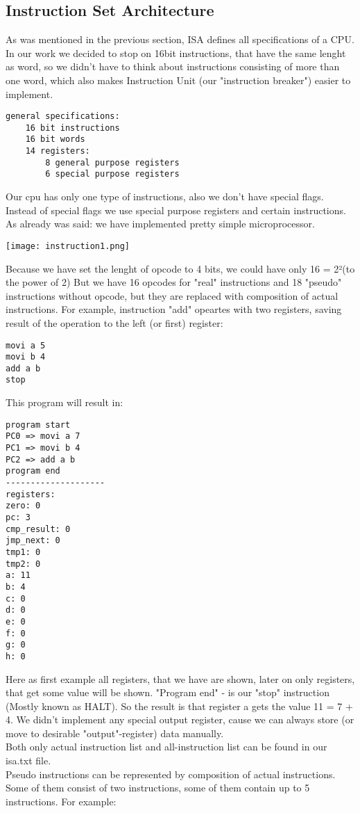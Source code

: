\documentclass[11pt,twoside,a4paper]{article}
\begin{document}
\subsection{Instruction Set Architecture}
As was mentioned in the previous section, ISA defines all specifications of a CPU. In our work we decided to stop on 16bit instructions, that have the same lenght as word, so we didn't have to think about instructions consisting of more than one word, which also makes Instruction Unit (our "instruction breaker") easier to implement.
\begin{verbatim}
general specifications:
	16 bit instructions
	16 bit words
	14 registers:
		8 general purpose registers
		6 special purpose registers
\end{verbatim}
Our cpu has only one type of instructions, also we don't have special flags. Instead of special flags we use special purpose registers and certain instructions. As already was said: we have implemented pretty simple microprocessor.
\begin{center}
\texttt{[image: instruction1.png]}
\end{center}
Because we have set the lenght of opcode to 4 bits, we could have only 16 = 2²(to the power of 2) But we have 16 opcodes for "real" instructions and 18 "pseudo" instructions without opcode, but they are replaced with composition of actual instructions. For example, instruction "add" opeartes with two registers, saving result of the operation to the left (or first) register:
\begin{verbatim}
movi a 5
movi b 4
add a b
stop
\end{verbatim}
This program will result in:
\begin{verbatim}
program start
PC0 => movi a 7
PC1 => movi b 4
PC2 => add a b
program end
--------------------
registers:
zero: 0
pc: 3
cmp_result: 0
jmp_next: 0
tmp1: 0
tmp2: 0
a: 11
b: 4
c: 0
d: 0
e: 0
f: 0
g: 0
h: 0
\end{verbatim}
Here as first example all registers, that we have are shown, later on only registers, that get some value will be shown. "Program end" - is our "stop" instruction (Mostly known as HALT). So the result is that register a gets the value 11 = 7 + 4. We didn't implement any special output register, cause we can always store (or move to desirable "output"-register) data manually.\\
Both only actual instruction list and all-instruction list can be found in our isa.txt file.\\
Pseudo instructions can be represented by composition of actual instructions. Some of them consist of two instructions, some of them contain up to 5 instructions. For example:
\end{document}
